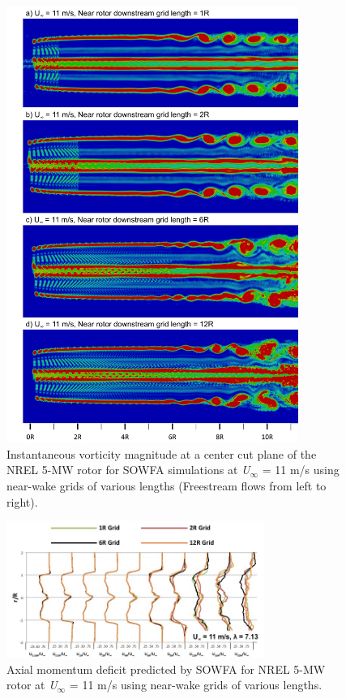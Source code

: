 \begin{figure}[htbp]
\centering
 \includegraphics[width=0.85\textwidth]{Figures/ch5Figures/VortSlice_Length}%
 \caption{ Instantaneous vorticity magnitude at a center cut plane of the NREL 5-MW rotor  for SOWFA simulations at \emph{U$_\infty$} = 11 m/s using near-wake grids of various lengths (Freestream flows from left to right). }
 \label{vortMag_Length}
\end{figure}   



\begin{figure}[htbp]
 \centering
 \includegraphics[width=0.75\textwidth]{Figures/ch5Figures/velDef_Length}
 \caption{ Axial momentum deficit predicted by SOWFA for NREL 5-MW rotor at \emph{U$_\infty$} = 11 m/s using near-wake grids of various lengths. }

 \label{wakeDef_Length}
\end{figure}    



